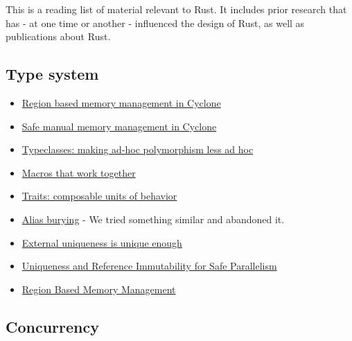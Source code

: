 This is a reading list of material relevant to Rust. It includes prior research that has - at one time or another - 
influenced the design of Rust, as well as publications about Rust.

\subsection{Type system}

\begin{itemize}
  \item{\href{http://209.68.42.137/ucsd-pages/Courses/cse227.w03/handouts/cyclone-regions.pdf}
          {Region based memory management in Cyclone}}
  \item{\href{http://www.cs.umd.edu/projects/PL/cyclone/scp.pdf}{Safe manual memory management in Cyclone}}
  \item{\href{http://www.ps.uni-sb.de/courses/typen-ws99/class.ps.gz}{Typeclasses: making ad-hoc polymorphism less ad hoc}}
  \item{\href{https://www.cs.utah.edu/plt/publications/jfp12-draft-fcdf.pdf}{Macros that work together}}
  \item{\href{http://scg.unibe.ch/archive/papers/Scha03aTraits.pdf}{Traits: composable units of behavior}}
  \item{\href{http://www.cs.uwm.edu/faculty/boyland/papers/unique-preprint.ps}{Alias burying} - 
          We tried something similar and abandoned it.}
  \item{\href{http://www.cs.uu.nl/research/techreps/UU-CS-2002-048.html}{External uniqueness is unique enough}}
  \item{\href{https://research.microsoft.com/pubs/170528/msr-tr-2012-79.pdf}
          {Uniqueness and Reference Immutability for Safe Parallelism}}
  \item{\href{http://www.cs.ucla.edu/\%7Epalsberg/tba/papers/tofte-talpin-iandc97.pdf}{Region Based Memory Management}}
\end{itemize}


\subsection{Concurrency}

